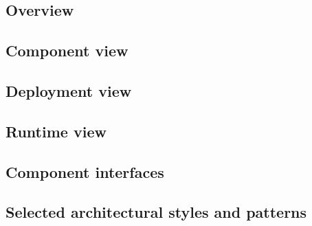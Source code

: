 \subsection{Overview}

\subsection{Component view}

\subsection{Deployment view}

\subsection{Runtime view}

\subsection{Component interfaces}

\subsection{Selected architectural styles and patterns}